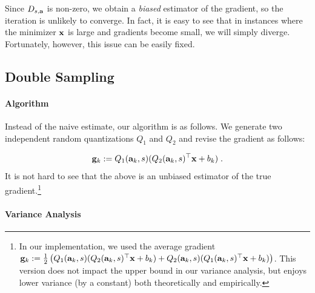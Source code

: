 \documentclass{article}
\def\a{{\bf a}}
\def\g{{\bf g}}
\def\x{{\bf x}}
\begin{document}
Since $D_{s, \a}$ is non-zero, we obtain a \emph{biased} estimator of the gradient, so the iteration is unlikely to converge. 
In fact, it is easy to see that in instances where the minimizer $\x$ is large and gradients become small, we will simply diverge. 
Fortunately, however, this issue can be easily fixed. 

\subsection{Double Sampling}

\paragraph{Algorithm}
Instead of the naive estimate, our algorithm is as follows.
We generate two independent
random quantizations $Q_1$
and $Q_2$ and revise the gradient as follows:


\[
\g_k := Q_1 (\a_k, s) (Q_2 (\a_k, s)^\top \x + b_k) \; .
\]
It is not hard to see that the above is an unbiased estimator of the true gradient.\footnote{In our implementation,
we used the average gradient $\g_k := \frac{1}{2}\left(Q_1 (\a_k, s) (Q_2 (\a_k, s)^\top \x + b_k) + 
Q_2 (\a_k, s) (Q_1 (\a_k, s)^\top \x + b_k)\right)$. This version does not impact  the upper bound in our variance analysis,
but enjoys lower variance (by a constant) both theoretically and empirically.}



\paragraph{Variance Analysis}
\end{document}
